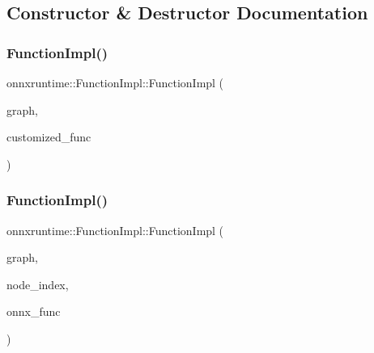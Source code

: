 \subsection{Constructor \& Destructor Documentation}
\mbox{\label{classonnxruntime_1_1FunctionImpl_a897e215474de502ee1cd211563b7ddea}} 
\subsubsection{\texorpdfstring{Function\+Impl()}{FunctionImpl()}\hspace{0.1cm}{\footnotesize\ttfamily [1/2]}}
{\footnotesize\ttfamily onnxruntime\+::\+Function\+Impl\+::\+Function\+Impl (\begin{DoxyParamCaption}\item[{const \mbox{\hyperlink{classonnxruntime_1_1Graph}{onnxruntime\+::\+Graph}} \&}]{graph,  }\item[{std\+::unique\+\_\+ptr$<$ \mbox{\hyperlink{structonnxruntime_1_1IndexedSubGraph}{Indexed\+Sub\+Graph}} $>$}]{customized\+\_\+func }\end{DoxyParamCaption})}

\mbox{\label{classonnxruntime_1_1FunctionImpl_ae08b81d4d3b431fd36ff839ca6c94bbc}} 
\subsubsection{\texorpdfstring{Function\+Impl()}{FunctionImpl()}\hspace{0.1cm}{\footnotesize\ttfamily [2/2]}}
{\footnotesize\ttfamily onnxruntime\+::\+Function\+Impl\+::\+Function\+Impl (\begin{DoxyParamCaption}\item[{const \mbox{\hyperlink{classonnxruntime_1_1Graph}{onnxruntime\+::\+Graph}} \&}]{graph,  }\item[{const \mbox{\hyperlink{namespaceonnxruntime_af8773b5c12b5d8fd9292eb2e268df760}{onnxruntime\+::\+Node\+Index}} \&}]{node\+\_\+index,  }\item[{const O\+N\+N\+X\+\_\+\+N\+A\+M\+E\+S\+P\+A\+C\+E\+::\+Function\+Proto $\ast$}]{onnx\+\_\+func }\end{DoxyParamCaption})}



